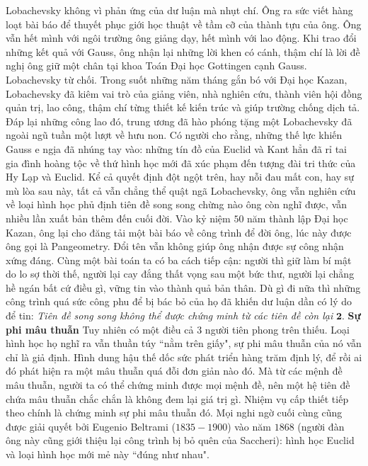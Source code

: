	\begin{multicols}{2}
	Lobachevsky không vì phản ứng của dư luận mà nhụt chí. Ông ra sức viết hàng loạt bài báo để thuyết phục giới học thuật về tầm cỡ của thành tựu của ông. Ông vẫn hết mình với ngôi trường ông giảng dạy, hết mình với lao động. Khi trao đổi những kết quả với Gauss, ông nhận lại những lời khen có cánh, thậm chí là lời đề nghị ông giữ một chân tại khoa Toán Đại học Gottingen cạnh Gauss. Lobachevsky từ chối. Trong suốt những năm tháng gắn bó với Đại học Kazan, Lobachevsky đã kiêm vai trò của giảng viên, nhà nghiên cứu, thành viên hội đồng quản trị, lao công, thậm chí từng thiết kế kiến trúc và giúp trường chống dịch tả.
	\vskip 0.1cm
	Đáp lại những công lao đó, trung ương đã hào phóng tặng một Lobachevsky đã ngoài ngũ tuần một lượt về hưu non. Có người cho rằng, những thế lực khiến Gauss e ngịa đã nhúng tay vào: những tín đồ của Euclid và Kant hẳn đã rỉ tai gia đình hoàng tộc về thứ hình học mới đã xúc phạm đến tượng đài tri thức của  Hy Lạp và Euclid. Kể cả quyết định đột ngột trên, hay nỗi đau mất con, hay sự mù lòa sau này, tất cả vẫn chẳng thể quật ngã Lobachevsky, ông vẫn nghiên cứu về loại hình học phủ định tiên đề song song chừng nào ông còn nghĩ được, vẫn nhiều lần xuất bản thêm đến cuối đời. Vào kỷ niệm $50$ năm thành lập Đại học Kazan, ông lại cho đăng tải một bài báo về công trình để đời ông, lúc này được ông gọi là Pangeometry. Đổi tên vẫn không giúp ông nhận được sự công nhận xứng đáng.
	\vskip 0.1cm
	Cùng một bài toán ta có ba cách tiếp cận: người thì giữ làm bí mật do lo sợ thời thế, người lại cay đắng thất vọng sau một bức thư, người lại chẳng hề ngán bất cứ điều gì, vững tin vào thành quả bản thân. Dù gì đi nữa thì những công trình quá sức công phu để bị bác bỏ của họ đã khiến dư luận dần có lý do để tin:
	\vskip 0.1cm
	\textit{Tiên đề song song không thể được chứng minh từ các tiên đề còn lại} 
	\vskip 0.1cm
	$\pmb{2.}$ \textbf{\color{lichsutoanhoc}Sự phi mâu thuẫn}
	\vskip 0.1cm
	Tuy nhiên có một điều cả $3$ người tiên phong trên thiếu. Loại hình học họ nghĩ ra vẫn thuần túy ``nằm trên giấy", sự phi mâu thuẫn của nó vẫn chỉ là giả định. Hình dung hậu thế dốc sức phát triển hàng trăm định lý, để rồi ai đó phát hiện ra một mâu thuẫn quá đỗi đơn giản nào đó. Mà từ các mệnh đề mâu thuẫn, người ta có thể chứng minh được mọi mệnh đề, nên một hệ tiên đề chứa mâu thuẫn chắc chắn là không đem lại giá trị gì. Nhiệm vụ cấp thiết tiếp theo chính là chứng minh sự phi mâu thuẫn đó.
	\vskip 0.1cm
	Mọi nghi ngờ cuối cùng cũng được giải quyết bởi Eugenio Beltrami ($1835-1900$) vào năm $1868$ (người đàn ông này cũng giới thiệu lại công trình bị bỏ quên của Saccheri): hình học Euclid và loại hình học mới mẻ này ``đúng như nhau". 

\end{multicols}

